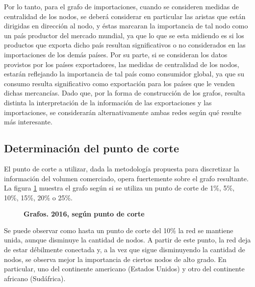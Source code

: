 \documentclass[class=article, crop=false]{standalone}
\begin{document}
Por lo tanto, para el grafo de importaciones, cuando se consideren medidas de centralidad de los nodos, se deberá considerar en particular las aristas que están dirigidas en dirección al nodo, y éstas marcaran la importancia de tal nodo como un país productor del mercado mundial, ya que lo que se esta midiendo es si los productos que exporta dicho país resultan significativos o no considerados en las importaciones de los demás países. Por su parte, si se consideran los datos provistos por los países exportadores, las medidas de centralidad de los nodos, estarán reflejando la importancia de tal país como consumidor global, ya que su consumo resulta significativo como exportación para los países que le venden dichas mercancías. 
Dado que, por la forma de construcción de los grafos, resulta distinta la interpretación de la información de las exportaciones y las importaciones, se considerarán alternativamente ambas redes según qué resulte más interesante. 


\subsection{Determinación del punto de corte}

El punto de corte a utilizar, dada la metodología propuesta para discretizar la información del volumen comerciado, opera fuertemente sobre el grafo resultante. La figura \ref{fig:grafo_2016} muestra el grafo según si se utiliza un punto de corte de 1\%, 5\%, 10\%, 15\%, 20\% o 25\%.

\begin{figure}
	\centering
	\caption{\textbf{Grafos. 2016, según punto de corte}}
	\label{fig:grafo_2016}
\end{figure}

Se puede observar como hasta un punto de corte del 10\% la red se mantiene unida, aunque disminuye la cantidad de nodos. A partir de este punto, la red deja de estar débilmente conectada y, a la vez que sigue disminuyendo la cantidad de nodos, se observa mejor la importancia de ciertos nodos de alto grado. En particular, uno del continente americano (Estados Unidos) y otro del continente africano (Sudáfrica).
\end{document}
